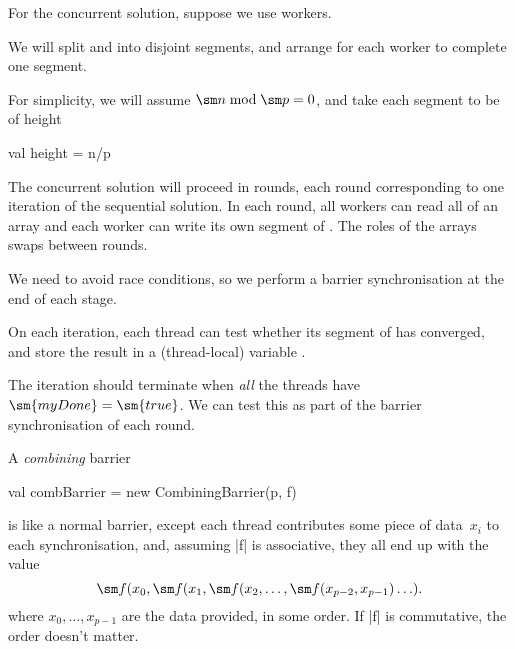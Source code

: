 
\begin{slide}

For the concurrent solution, suppose we use  workers.

We will split  and  into  disjoint
segments, and arrange for each worker to complete one segment.

For simplicity, we will assume $\sm n \bmod \sm p = 0$, and take each
segment to be of height
\begin{scala}
val height = n/p
\end{scala}
\end{slide}


\begin{slide}

The concurrent solution will proceed in rounds, each round corresponding to
one iteration of the sequential solution.  In each round, all workers can read
all of an array  and each worker can write its own segment of
.  The roles of the arrays swaps between rounds.

We need to avoid race conditions, so we perform a barrier synchronisation at
the end of each stage.

\end{slide}


\begin{slide}

On each iteration, each thread can test whether its segment of  has
converged, and store the result in a (thread-local) variable .

The iteration should terminate when \emph{all} the threads have $\sm{myDone} =
\sm{true}$.  We can test this as part of the barrier synchronisation of each
round.

A \emph{combining} barrier 
\begin{scala}
  val combBarrier = new CombiningBarrier(p, f)
\end{scala}
is like a normal barrier, except each thread contributes some piece of
data~$x_i$ to each synchronisation, and, assuming |f| is associative, they all
end up with the value
\[
\sm f(x_0, \sm f(x_1, \sm f(x_2, \ldots, \sm f(x_{p-2}, x_{p-1})\ldots).
\]
where $x_0, \ldots, x_{p-1}$ are the data provided, in some order.  If |f| is
commutative, the order doesn't matter. 
\end{slide}

